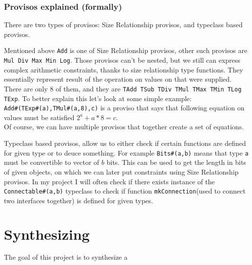 \documentclass[14pt]{report}
\begin{document}
\subsubsection*{Provisos explained (formally)}
There are two types of provisos: Size Relationship provisos, and typeclass based provisos.

Mentioned above \verb!Add! is one of Size Relationship provisos, other such provisos are \verb!Mul Div Max Min Log!. Those provisos can't be nested, but we still can express complex arithmetic constraints, thanks to size relationship type functions. They essentially represent result of the operation on values on that were supplied. There are only 8 of them, and they are \verb!TAdd TSub TDiv TMul TMax TMin TLog TExp!.
To better explain this let's look at some simple example: \\
\verb!Add#(TExp#(a),TMul#(a,8),c)! is a proviso that says that following equation on values must be satisfied $2^a+a*8 = c$. \\
Of course, we can have multiple provisos that together create a set of equations. 

Typeclass based provisos, allow us to either check if certain functions are defined for given type or to deuce something. For example \verb!Bits#(a,b)! means that type \verb!a! must be convertible to vector of $b$ bits. This can be used to get the length in bits of given objects, on which we can later put constraints using Size Relationship provisos.
In my project I will often check if there exists instance of the \verb!Connectable#(a,b)! typeclass to check if function \verb!mkConnection!(used to connect two interfaces together) is defined for given types.

\section{Synthesizing}
The goal of this project is to synthesize a 
\end{document}
